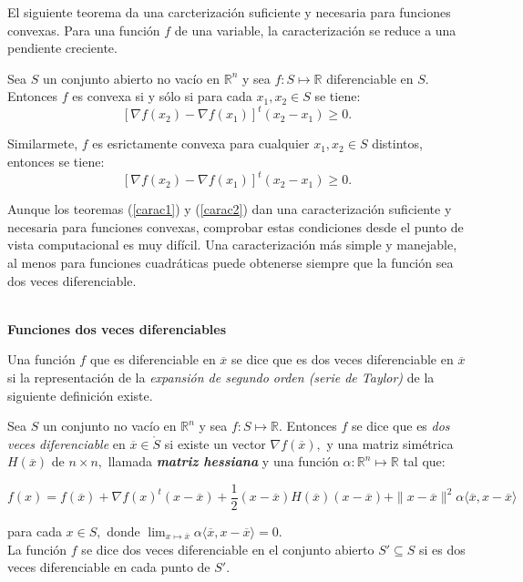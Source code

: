 El siguiente teorema da una carcterizaci\'on suficiente y necesaria para funciones convexas. Para una funci\'on $f$ de una variable, la 
caracterizaci\'on se reduce a una pendiente creciente.\\ 

{\teorema Sea $S$ un conjunto abierto no vac\'io en $\mathbb{R}^n$ y sea $f: S \longmapsto \mathbb{R}$ diferenciable en $S.$ Entonces $f$ es
convexa si y s\'olo si para cada $x_1, x_2 \in S$ se tiene:
$$[\nabla f(x_2) - \nabla f(x_1)]^t (x_2 - x_1) \geqslant 0.$$

Similarmete, $f$ es esrictamente convexa para cualquier $x_1, x_2 \in S$ distintos, entonces se tiene:
$$[\nabla f(x_2) - \nabla f(x_1)]^t (x_2 - x_1) \geqslant 0.$$ \label{carac2}}
\medskip

Aunque los teoremas (\ref{carac1}) y (\ref{carac2}) dan una caracterizaci\'on suficiente y necesaria para funciones convexas, comprobar
estas condiciones desde el punto de vista computacional es muy dif\'icil. Una caracterizaci\'on m\'as simple y manejable, al menos para 
funciones cuadr\'aticas puede obtenerse siempre que la funci\'on sea dos veces diferenciable. \\ \

\textbf{Funciones dos veces diferenciables} \cite{no-lineal}\\
\medskip

Una funci\'on $f$ que es diferenciable en $\overline{x}$ se dice que es dos veces diferenciable en $\overline{x}$ si la representaci\'on de la
{\it expansi\'on de segundo orden (serie de Taylor)} de la siguiente definici\'on existe.\\ 
\medskip

{ Sea $S$ un conjunto no vac\'io en $\mathbb{R}^n$ y sea $f: S \longmapsto \mathbb{R}.$ Entonces $f$ se dice que es {\itshape dos
veces diferenciable} en $\overline{x} \in \mathring{S}$ si existe un vector $\nabla f(\overline{x}),$ y una matriz sim\'etrica 
$H( \overline{x} )$ de $n \times n,$ llamada {\bf{\itshape matriz hessiana}} y una funci\'on $\alpha:\mathbb{R}^n \longmapsto \mathbb{R}$ tal que:

$$f(x) = f(\overline{x}) + \nabla f(x)^t (x-\overline{x}) + \dfrac{1}{2} (x-\overline{x}) H(\overline{x}) (x-\overline{x}) + 
\parallel x-\overline{x} \parallel ^2 \alpha \langle \overline{x}, x-\overline{x} \rangle$$

para cada $x \in S,$ donde $\displaystyle{\lim_{x\longmapsto \overline{x}} \alpha \langle \overline{x}, x-\overline{x} \rangle = 0}.$ \\
La funci\'on $f$ se dice dos veces diferenciable en el conjunto abierto $S' \subseteq S$ si es dos veces diferenciable en cada punto de $S'.$
\label{dos-dif}} \\

